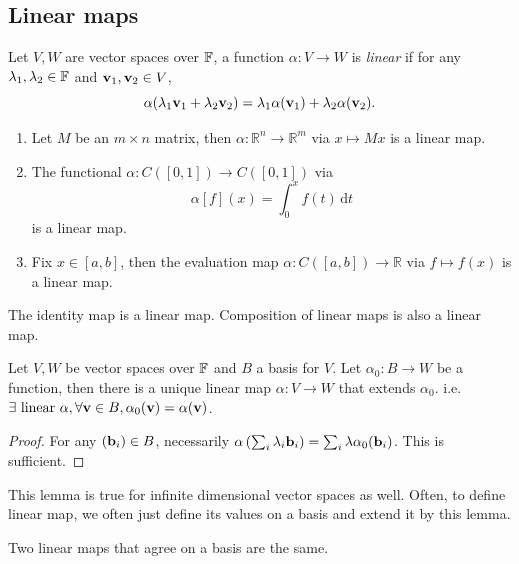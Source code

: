 \documentclass[a4paper,11pt]{article}
\begin{document}
\subsection{Linear maps}
\begin{definition}
    Let $V,W$ are vector spaces over ${\mathbb{F}}$, a function $\alpha:V\to W$ is \textit{linear} if for any $\lambda_1,\lambda_2\in {\mathbb{F}}$ and ${\bf v}_1,{\bf v}_2\in V$,
    $$\alpha(\lambda_1{\bf v}_1+\lambda_2{\bf v}_2)=\lambda_1\alpha({\bf v}_1)+\lambda_2\alpha({\bf v}_2).$$
\end{definition}
\begin{example}
    \begin{enumerate}
        \item Let $M$ be an $m\times n$ matrix, then $\alpha:\mathbb R^n\to\mathbb R^m$ via $x\mapsto Mx$ is a linear map.
        \item The functional $\alpha:C([0,1])\to C([0,1])$ via
        $$\alpha[f](x)=\int_0^xf(t)\,\mathrm dt$$
        is a linear map.
        \item Fix $x\in[a,b]$, then the evaluation map $\alpha:C([a,b])\to\mathbb R$ via $f\mapsto f(x)$ is a linear map.
    \end{enumerate}
\end{example}
\begin{remark}
    The identity map is a linear map.
    Composition of linear maps is also a linear map.
\end{remark}
\begin{lemma}
    Let $V,W$ be vector spaces over ${\mathbb{F}}$ and $B$ a basis for $V$.
    Let $\alpha_0:B\to W$ be a function, then there is a unique linear map $\alpha:V\to W$ that extends $\alpha_0$. i.e. $\exists \text{ linear }\alpha, \forall{\bf v}\in B, \alpha_0({\bf v})=\alpha({\bf v}) $.
\end{lemma}
\begin{proof}
    For any $({\bf b}_i)\in B$, necessarily $\alpha\left(\sum_i\lambda_i{\bf b}_i\right)=\sum_i\lambda\alpha_0({\bf b}_i)$.
    This is sufficient.
\end{proof}
\begin{remark}
    This lemma is true for infinite dimensional vector spaces as well.
    Often, to define linear map, we often just define its values on a basis and extend it by this lemma.
\end{remark}
\begin{corollary}
    Two linear maps that agree on a basis are the same.
\end{corollary}
\end{document}
